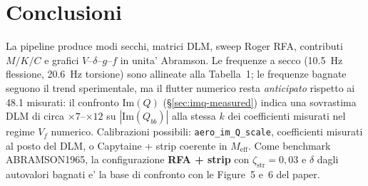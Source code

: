 \documentclass[11pt,a4paper]{article}
\begin{document}
\section{Conclusioni}

La pipeline produce modi secchi, matrici DLM, sweep Roger RFA, contributi $M/K/C$ e grafici
$V$--$\delta$--$g$--$f$ in unita' Abramson.
Le frequenze a secco (\SI{10.5}{\hertz} flessione, \SI{20.6}{\hertz} torsione) sono allineate
alla Tabella~1; le frequenze bagnate seguono il trend sperimentale, ma il flutter numerico
resta \emph{anticipato} rispetto ai \SI{48.1}{\knunit} misurati: il confronto
$\mathrm{Im}(Q)$ (\S\ref{sec:imq-measured}) indica una sovrastima DLM di circa
$\times 7$--$\times 12$ su $|\mathrm{Im}(Q_{bb})|$ alla stessa $k$ dei coefficienti misurati
nel regime $V_f$ numerico. Calibrazioni possibili: \texttt{aero\_im\_Q\_scale},
coefficienti misurati al posto del DLM, o Capytaine + strip coerente in $M_\mathrm{eff}$.
Come benchmark ABRAMSON1965, la configurazione \textbf{RFA + strip} con
$\zeta_\mathrm{str}=0{,}03$ e $\delta$ dagli autovalori bagnati e' la base di confronto
con le Figure~5 e~6 del paper.
\end{document}
